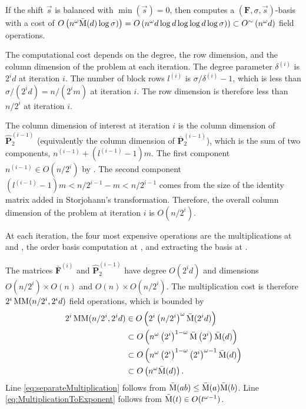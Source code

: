 \begin{thm}
\label{thm:balancedCost}If the shift $\vec{s}$ is balanced with
$\min\left(\vec{s}\right)=0$, then  computes
a $\left(\mathbf{F},\sigma,\vec{s}\right)$-basis with a cost of $O\left(n^{\omega}\bar{\M}(d)\log\sigma)\right)=O\left(n^{\omega}d\log d\log\log d\log\sigma)\right)\subset O^{\sim}\left(n^{\omega}d\right)$
field operations. \end{thm}
\begin{pf}
The computational cost depends on the degree, the row dimension, and
the column dimension of the problem at each iteration. The degree
parameter $\delta^{\left(i\right)}$ is $2^{i}d$ at iteration $i$.
The number of block rows $l^{\left(i\right)}$ is $\sigma/\delta^{\left(i\right)}-1$,
which is less than $\sigma/(2^{i}d)=n/(2^{i}m)$ at iteration $i$.
The row dimension is therefore less than $n/2^{i}$ at iteration $i$.

The column dimension of interest at iteration $i$ is the column dimension
of $\hat{\mathbf{P}}_{2}^{\left(i-1\right)}$ (equivalently the column
dimension of $\bar{\mathbf{P}}_{2}^{\left(i-1\right)}$), which is
the sum of two components, $n^{\left(i-1\right)}+(l^{\left(i-1\right)}-1)m$.
The first component $n^{\left(i-1\right)}\in O(n/2^{i})$ by .
The second component $(l^{\left(i-1\right)}-1)m<n/2^{i-1}-m<n/2^{i-1}$
comes from the size of the identity matrix added in Storjohann's transformation.
Therefore, the overall column dimension of the problem at iteration
$i$ is $O(n/2^{i})$.

At each iteration, the four most expensive operations are the multiplications
at  and ,
the order basis computation at ,
and extracting the basis at .

The matrices $\bar{\mathbf{F}}^{\left(i\right)}$ and $\hat{\mathbf{P}}_{2}^{\left(i-1\right)}$
have degree $O(2^{i}d)$ and dimensions $O(n/2^{i})\times O\left(n\right)$
and $O\left(n\right)\times O(n/2^{i})$. The multiplication cost is
therefore $2^{i}\MM(n/2^{i},2^{i}d)$ field operations, which is bounded
by\begin{align}
2^{i}\MM(n/2^{i},2^{i}d) & \in O\left(2^{i}\left(n/2^{i}\right)^{\omega}\bar{\M}(2^{i}d)\right)\label{eq:MMtoM}\\
 & \subset O\left(n^{\omega}\left(2^{i}\right)^{1-\omega}\bar{\M}\left(2^{i}\right)\bar{\M}(d)\right)\label{eq:separateMultiplication}\\
 & \subset O\left(n^{\omega}\left(2^{i}\right)^{1-\omega}\left(2^{i}\right)^{\omega-1}\bar{\M}(d)\right)\label{eq:MultiplicationToExponent}\\
 & \subset O\left(n^{\omega}\bar{\M}(d)\right).\nonumber \end{align}
 Line \ref{eq:separateMultiplication} follows from $\bar{\M}(ab)\le\bar{\M}(a)\bar{\M}(b)$.
Line \ref{eq:MultiplicationToExponent} follows from $\bar{\M}(t)\in O(t^{\omega-1})$.


\end{pf}
